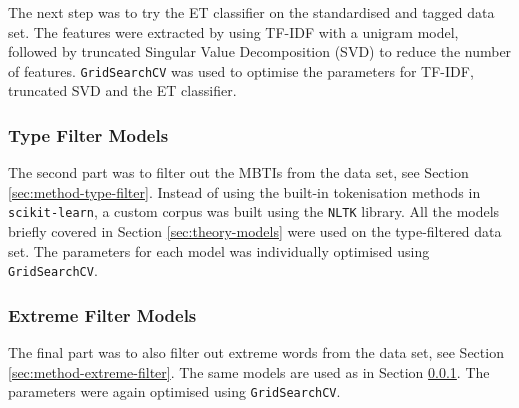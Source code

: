 The next step was to try the ET classifier on the standardised and tagged data set.
The features were extracted by using TF-IDF with a unigram model, followed by truncated Singular Value Decomposition (SVD) to reduce the number of features.
\texttt{GridSearchCV} was used to optimise the parameters for TF-IDF, truncated SVD and the ET classifier.

\subsubsection{Type Filter Models} \label{sec:method-type-filter-models}
The second part was to filter out the MBTIs from the data set, see Section \ref{sec:method-type-filter}.
Instead of using the built-in tokenisation methods in \texttt{scikit-learn}, a custom corpus was built using the \texttt{NLTK} library.
All the models briefly covered in Section \ref{sec:theory-models} were used on the type-filtered data set.
The parameters for each model was individually optimised using \texttt{GridSearchCV}.

\subsubsection{Extreme Filter Models}  \label{sec:method-extreme-filter-models}
The final part was to also filter out extreme words from the data set, see Section \ref{sec:method-extreme-filter}.
The same models are used as in Section \ref{sec:method-type-filter-models}.
The parameters were again optimised using \texttt{GridSearchCV}.